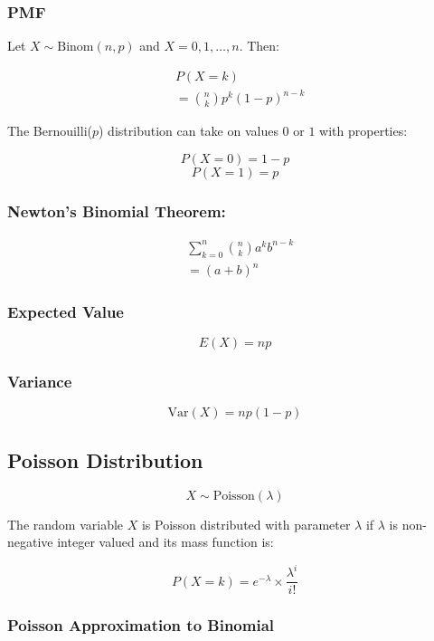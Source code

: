 \subsubsection*{PMF}

Let $X \sim \text{Binom}(n,p)$ and $X = 0,1,\dots,n$. Then:

\begin{align*}
     & P(X = k)                       \\
     & = \binom{n}{k} p^k (1-p)^{n-k}
\end{align*}

The Bernouilli($p$) distribution can take on values $0$ or $1$ with properties:

$$ P(X = 0) = 1 - p $$
$$ P(X = 1) = p $$

\subsubsection*{Newton's Binomial Theorem:}

\begin{align*}
     & \sum_{k=0}^n \binom{n}{k} a^k b^{n-k} \\
     & =(a + b)^n
\end{align*}

\subsubsection*{Expected Value}

$$ E(X) = np $$

\subsubsection*{Variance}

$$ \text{Var}(X) = np(1-p) $$

\subsection*{Poisson Distribution}

$$ X \sim \text{Poisson}(\lambda) $$

The random variable $X$ is Poisson distributed with parameter $\lambda$ if $\lambda$ is non-negative integer valued and its mass function is:

$$ P(X = k) = e^{-\lambda} \times \frac{\lambda^i}{i!} $$

\subsubsection{Poisson Approximation to Binomial}

